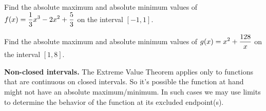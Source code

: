 \documentclass[10pt]{article}
\begin{document}
\vfill
 

 

{\exercise} Find the absolute maximum and absolute minimum values of $\displaystyle f(x)=\frac{1}{3}x^3-2x^2+\frac{5}{3}$ on the interval $[-1,1]$.   
    \vfill

\newpage
    
{\exercise} Find the absolute maximum and absolute minimum values of $\displaystyle g(x)=x^2+\frac{128}{x}$ on the interval $[1,8]$.
    
    \vfill
    


{\bf\color{blue} Non-closed intervals.} The Extreme Value Theorem applies only to functions that are continuous on closed intervals. So it's possible the function at hand might not have  an absolute maximum/minimum. In such cases we may use limits to determine the behavior of the function at its excluded endpoint(s).\\
\end{document}
